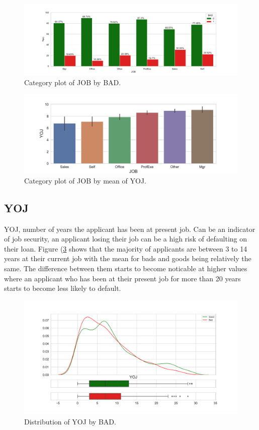 \begin{figure}[!ht]
	\centering
	\includegraphics[scale=0.40]{figs/job_cat.pdf}
	\caption{Category plot of JOB by BAD. \label{job_cat}}
\end{figure}

\begin{figure}[!ht]
	\centering
	\includegraphics[scale=0.40]{figs/job_yoj_cat.pdf}
	\caption{Category plot of JOB by mean of YOJ. \label{job_yoj_cat}}
\end{figure}

\subsection*{YOJ}

YOJ,  number of years the applicant has been at present job. Can be an indicator of job security,  an applicant losing their job can be a high risk of defaulting on their loan. Figure (\ref{yoj_dist} shows that the majority of applicants are between 3 to 14 years at their current job with the mean for bads and goods being relatively the same. The difference between them starts to become noticable at higher values where an applicant who has been at their present job for more than 20 years starts to become less likely to default.

\begin{figure}[!ht]
	\centering
	\includegraphics[scale=0.40]{figs/yoj_dist.pdf}
	\caption{Distribution of YOJ by BAD. \label{yoj_dist}}
\end{figure}

